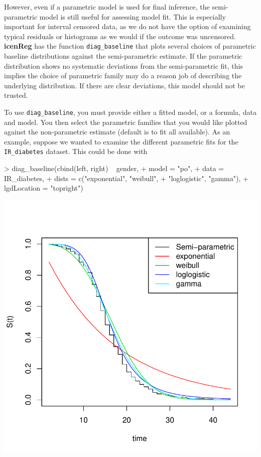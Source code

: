 \documentclass[a4paper]{article}
\begin{document}
  
However, even if a parametric model is used for final inference, the semi-parametric model is still useful for assessing model fit. This is especially important for interval censored data, as we do not have the option of examining typical residuals or histograms as we would if the outcome was uncensored. {\bf icenReg} has the function \texttt{diag\_baseline} that plots several choices of parametric baseline distributions against the semi-parametric estimate. If the parametric distribution shows no systematic deviations from the semi-parametric fit, this implies the choice of parametric family may do a reason job of describing the underlying distribution. If there are clear deviations, this model should not be trusted. 
  
To use \texttt{diag\_baseline}, you must provide either a fitted model, or a formula, data and model. You then select the parametric families that you would like plotted against the non-parametric estimate (default is to fit all available). As an example, suppose we wanted to examine the different parametric fits for the \texttt{IR\_diabetes} dataset. This could be done with 
  
\begin{Schunk}
\begin{Sinput}
> diag_baseline(cbind(left, right) ~ gender,
+     model = "po",
+     data = IR_diabetes,
+     dists = c("exponential", "weibull", 
+               "loglogistic", "gamma"),
+     lgdLocation = "topright")
\end{Sinput}
\end{Schunk}
\includegraphics{icenReg-021}
\end{document}
